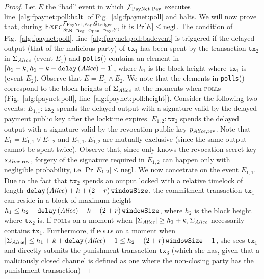 \begin{proof}
  Let $E$ the ``bad'' event in which $\mathcal{F}_{\mathrm{PayNet}}{}_{\mathrm{, Pay}}$ executes
  line~\ref{alg:fpaynet:poll:halt} of Fig.~\ref{alg:fpaynet:poll} and halts. We
  will now prove that, during $\textsc{Exec}^{\mathcal{F}_{\mathrm{PayNet}}{}_{\mathrm{, Pay}},
  \mathcal{G}_{\mathrm{Ledger}}}_{\mathcal{S}_{\mathrm{LN - Reg - Open - Pay}}, \mathcal{E}}$, it is
  $\Pr[E] \leq \text{negl}$. The condition of Fig.~\ref{alg:fpaynet:poll},
  line~\ref{alg:fpaynet:poll:badevent} is triggered if the delayed output (that
  of the malicious party) of $\mathtt{tx}_1$ has been spent by the transaction
  $\mathtt{tx}_2$ in $\Sigma_{\mathit{Alice}}$ (event $E_1$) and \texttt{polls}(\alice)
  contains an element in $\left[h_1 + k, h_1 + k +
  \mathtt{delay}\left(\mathit{Alice}\right) - 1\right]$, where $h_1$ is the block height
  where $\mathtt{tx}_1$ is (event $E_2$). Observe that $E = E_1 \wedge E_2$. We
  note that the elements in \texttt{polls}(\alice) correspond to the block
  heights of $\Sigma_{\mathit{Alice}}$ at the moments when \alice{} \textsc{poll}s
  (Fig.~\ref{alg:fpaynet:poll}, line~\ref{alg:fpaynet:poll:height}). Consider
  the following two events: $E_{1,1}: \mathtt{tx}_2$ spends the delayed output
  with a signature valid by the delayed payment public key after the locktime
  expires. $E_{1,2}: \mathtt{tx}_2$ spends the delayed output with a signature
  valid by the revocation public key $p_{\mathit{Alice}, \mathrm{rev}}$. Note that $E_1
  = E_{1,1} \vee E_{1,2}$ and $E_{1,1}, E_{1,2}$ are mutually exclusive (since
  the same output cannot be spent twice). Observe that, since only \alice{}
  knows the revocation secret key $s_{\mathit{Alice}, \mathrm{rev}}$, forgery of the
  signature required in $E_{1,2}$ can happen only with negligible probability,
  i.e. $\Pr\left[E_{1,2}\right] \leq \text{negl}$. We now concetrate on the event
  $E_{1,1}$. Due to the fact that $\mathtt{tx}_2$ spends an output locked with a
  relative timelock of length $\mathtt{delay}\left(\mathit{Alice}\right) + k +
  \left(2 + r\right)\texttt{windowSize}$, the commitment transaction $\mathtt{tx}_1$ can reside in a block
  of maximum height $h_1 \leq h_2 - \mathtt{delay}\left(\mathit{Alice}\right) - k -
  \left(2 + r\right)\texttt{windowSize}$, where $h_2$ is the block height where $\mathtt{tx}_2$ is. If
  \alice{} \textsc{poll}s on a moment when $|\Sigma_{\mathit{Alice}}| \geq h_1 + k,
  \Sigma_{\mathit{Alice}}$ necessarily contains $\mathtt{tx}_1$. Furthermore, if
  \alice{} \textsc{poll}s on a moment when $|\Sigma_{\mathit{Alice}}| \leq h_1 + k +
  \mathtt{delay}\left(\mathit{Alice}\right) - 1 \leq h_2 - \left(2 + r\right)\texttt{windowSize}{} - 1$, she sees
  $\mathtt{tx}_1$ and directly submits the punishment transaction
  $\mathtt{tx}_3$ (which she has, given that a maliciously closed channel is
  defined as one where the non-closing party has the punishment transaction)

\end{proof}
